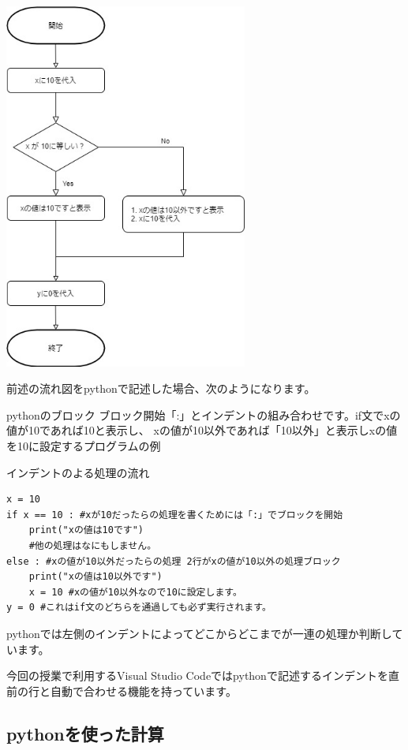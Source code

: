 \documentclass[11pt,a4paper,dvipdfmx,titlepage]{jsreport}
\begin{document}
\includegraphics[width=8cm]{images/ifflow.jpg}

\newpage
前述の流れ図をpythonで記述した場合、次のようになります。 
\begin{pabox}{pythonのブロック}
ブロック開始「:」とインデントの組み合わせです。if文でxの値が10であれば10と表示し、
xの値が10以外であれば「10以外」と表示しxの値を10に設定するプログラムの例
\begin{legbox}{インデントのよる処理の流れ}
\begin{verbatim}
x = 10
if x == 10 : #xが10だったらの処理を書くためには「:」でブロックを開始
    print("xの値は10です")
    #他の処理はなにもしません。
else : #xの値が10以外だったらの処理 2行がxの値が10以外の処理ブロック
    print("xの値は10以外です")
    x = 10 #xの値が10以外なので10に設定します。
y = 0 #これはif文のどちらを通過しても必ず実行されます。
\end{verbatim}
\end{legbox}
pythonでは左側のインデントによってどこからどこまでが一連の処理か判断しています。
\end{pabox}
今回の授業で利用するVisual Studio Codeではpythonで記述するインデントを直前の行と自動で合わせる機能を持っています。

\newpage
\subsection{pythonを使った計算}
\end{document}
